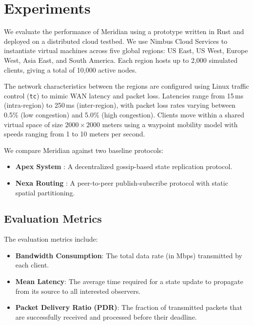 \section{Experiments}
We evaluate the performance of Meridian using a prototype written in Rust and deployed on a distributed cloud testbed. We use Nimbus Cloud Services \cite{nimbus2024cloud} to instantiate virtual machines across five global regions: US East, US West, Europe West, Asia East, and South America. Each region hosts up to 2,000 simulated clients, giving a total of 10,000 active nodes.

The network characteristics between the regions are configured using Linux traffic control (\texttt{tc}) to mimic WAN latency and packet loss. Latencies range from 15\,ms (intra-region) to 250\,ms (inter-region), with packet loss rates varying between 0.5\% (low congestion) and 5.0\% (high congestion). Clients move within a shared virtual space of size $2000 \times 2000$ meters using a waypoint mobility model with speeds ranging from 1 to 10 meters per second.

We compare Meridian against two baseline protocols:
\begin{itemize}
    \item \textbf{Apex System} \cite{apex2022routing}: A decentralized gossip-based state replication protocol.
    \item \textbf{Nexa Routing} \cite{nexa2023scaling}: A peer-to-peer publish-subscribe protocol with static spatial partitioning.
\end{itemize}

\subsection{Evaluation Metrics}
The evaluation metrics include:
\begin{itemize}
    \item \textbf{Bandwidth Consumption}: The total data rate (in Mbps) transmitted by each client.
    \item \textbf{Mean Latency}: The average time required for a state update to propagate from its source to all interested observers.
    \item \textbf{Packet Delivery Ratio (PDR)}: The fraction of transmitted packets that are successfully received and processed before their deadline.
\end{itemize}
